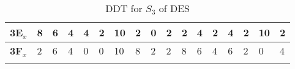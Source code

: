 \begin{longtable}[c]{|l|l|l|l|l|l|l|l|l|l|l|l|l|l|l|l|l|}
\textbf{3E$_x$} & 8              & 6              & 4              & 4              & 2              & 10             & 2              & 0              & 2              & 2              & 4              & 2              & 4              & 2              & 10             & 2              \\ \hline
\textbf{3F$_x$} & 2              & 6              & 4              & 0              & 0              & 10             & 8              & 2              & 2              & 8              & 6              & 4              & 6              & 2              & 0              & 4              \\ \hline
\caption{DDT for $S_3$ of DES}
\label{tab:ddt-s3-des}
\end{longtable}